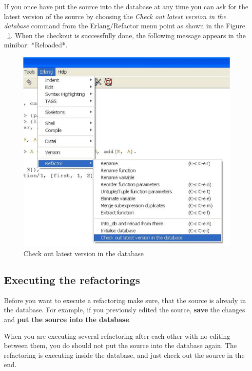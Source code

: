 \documentclass[12pt]{article}
\begin{document}
If you once have put the source into the database at any time you can ask for the latest version of the source by 
choosing the {\it Check out latest version in the database} command from the Erlang/Refactor menu point as shown in the Figure ~\ref{cho}.
When the checkout is successfully done, the following message appears in the minibar: *Reloaded*. 

\begin{center}
\begin{figure}[htbp]

    \includegraphics[scale=0.80]{checkout.eps}
   \caption{Check out latest version in the database}
  \label{cho}
\end{figure}
\end{center}

\subsection{Executing the refactorings}

Before you want to execute a refactoring make sure, that the source is already in the database.
For example, if you previously edited the source, {\bf save} the changes and {\bf put the source into the database}.

When you are executing several refactoring after each other with no editing between them, 
you do should not put the source into the database again. 
The refactoring is executing inside the database, and just check out the source in the end.
\end{document}
